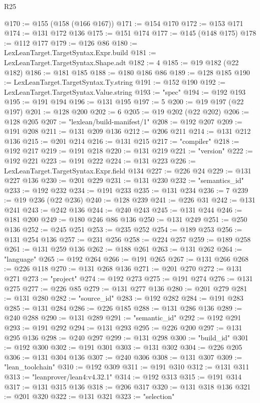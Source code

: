 \begin{lexlean}{R25}
\begin{coremodule}
{{{{{{{{{{{{{{{{{{{{{{{{{{{{{{{{{{{{{{{{{{{{{{{{{{{{{{{{{{{{{{{{{{{{{{{{{{{{{{{{{{{{{{{{{{{{{{{{{{{{{{{{{{{{{{{{{{{{{{{{{{{{{{{{{{{{{{{{{{{{{{{{{{{{{{{{{{{{{{{{{{{{{{{{{{{{{{{{{{{{{{{{{{{{{{{{{{{{{{{@170 := @155 (@158 (@166 @167))
@171 := @154 @170
@172 := @153 @171
@174 := @131 @172 @136
@175 := @151 @174
@177 := @145 (@148 @175)
@178 := @112 @177
@179 := @126 @86
@180 := LexLeanTarget.TargetSyntax.Expr.build
@181 := LexLeanTarget.TargetSyntax.Shape.adt
@182 := 4
@185 := @19 @182 (@22 @182)
@186 := @181 @185
@188 := @180 @186 @86
@189 := @128 @185
@190 := LexLeanTarget.TargetSyntax.Ty.string
@191 := @152 @190
@192 := LexLeanTarget.TargetSyntax.Value.string
@193 := "spec"
@194 := @192 @193
@195 := @191 @194
@196 := @131 @195
@197 := 5
@200 := @19 @197 (@22 @197)
@201 := @128 @200
@202 := 6
@205 := @19 @202 (@22 @202)
@206 := @128 @205
@207 := "lexlean/build-manifest/1"
@208 := @192 @207
@209 := @191 @208
@211 := @131 @209 @136
@212 := @206 @211
@214 := @131 @212 @136
@215 := @201 @214
@216 := @131 @215
@217 := "compiler"
@218 := @192 @217
@219 := @191 @218
@220 := @131 @219
@221 := "version"
@222 := @192 @221
@223 := @191 @222
@224 := @131 @223
@226 := LexLeanTarget.TargetSyntax.Expr.field @134
@227 := @226 @24
@229 := @131 @227 @136
@230 := @201 @229
@231 := @131 @230
@232 := "semantics_id"
@233 := @192 @232
@234 := @191 @233
@235 := @131 @234
@236 := 7
@239 := @19 @236 (@22 @236)
@240 := @128 @239
@241 := @226 @31
@242 := @131 @241
@243 := @242 @136
@244 := @240 @243
@245 := @131 @244
@246 := @181 @200
@249 := @180 @246 @86 @136
@250 := @131 @249
@251 := @250 @136
@252 := @245 @251
@253 := @235 @252
@254 := @189 @253
@256 := @131 @254 @136
@257 := @231 @256
@258 := @224 @257
@259 := @189 @258
@261 := @131 @259 @136
@262 := @188 @261
@263 := @131 @262
@264 := "language"
@265 := @192 @264
@266 := @191 @265
@267 := @131 @266
@268 := @226 @118
@270 := @131 @268 @136
@271 := @201 @270
@272 := @131 @271
@273 := "project"
@274 := @192 @273
@275 := @191 @274
@276 := @131 @275
@277 := @226 @85
@279 := @131 @277 @136
@280 := @201 @279
@281 := @131 @280
@282 := "source_id"
@283 := @192 @282
@284 := @191 @283
@285 := @131 @284
@286 := @226 @185
@288 := @131 @286 @136
@289 := @240 @288
@290 := @131 @289
@291 := "semantic_id"
@292 := @192 @291
@293 := @191 @292
@294 := @131 @293
@295 := @226 @200
@297 := @131 @295 @136
@298 := @240 @297
@299 := @131 @298
@300 := "build_id"
@301 := @192 @300
@302 := @191 @301
@303 := @131 @302
@304 := @226 @205
@306 := @131 @304 @136
@307 := @240 @306
@308 := @131 @307
@309 := "lean_toolchain"
@310 := @192 @309
@311 := @191 @310
@312 := @131 @311
@313 := "leanprover/lean4:v4.32.1"
@314 := @192 @313
@315 := @191 @314
@317 := @131 @315 @136
@318 := @206 @317
@320 := @131 @318 @136
@321 := @201 @320
@322 := @131 @321
@323 := "selection"
}}}}}}}}}}}}}}}}}}}}}}}}}}}}}}}}}}}}}}}}}}}}}}}}}}}}}}}}}}}}}}}}}}}}}}}}}}}}}}}}}}}}}}}}}}}}}}}}}}}}}}}}}}}}}}}}}}}}}}}}}}}}}}}}}}}}}}}}}}}}}}}}}}}}}}}}}}}}}}}}}}}}}}}}}}}}}}}}}}}}}}}}}}}}}}}}}}}}}}}
\end{coremodule}
\end{lexlean}
